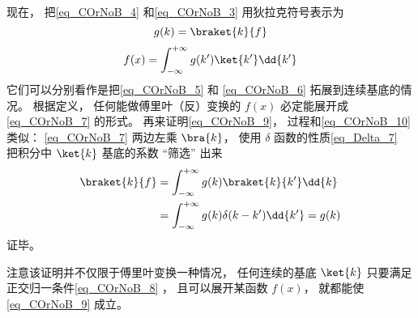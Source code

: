 现在， 把\autoref{eq_COrNoB_4}  和\autoref{eq_COrNoB_3} 用狄拉克符号表示为
\begin{equation}\label{eq_COrNoB_9}
g(k) = \braket{k}{f}
\end{equation}
\begin{equation}\label{eq_COrNoB_7}
f(x) = \int_{-\infty}^{+\infty} g(k') \ket{k'} \dd{k'}
\end{equation}
它们可以分别看作是把\autoref{eq_COrNoB_5} 和 \autoref{eq_COrNoB_6} 拓展到连续基底的情况。 根据定义， 任何能做傅里叶（反）变换的 $f(x)$ 必定能展开成\autoref{eq_COrNoB_7} 的形式。 再来证明\autoref{eq_COrNoB_9}， 过程和\autoref{eq_COrNoB_10} 类似： \autoref{eq_COrNoB_7} 两边左乘 $\bra{k}$， 使用 $\delta$ 函数的性质\autoref{eq_Delta_7}~ 把积分中 $\ket{k}$ 基底的系数 “筛选” 出来
\begin{equation}
\begin{aligned}
\braket{k}{f} &= \int_{-\infty}^{+\infty} g(k) \braket{k}{k'} \dd{k}\\
&= \int_{-\infty}^{+\infty} g(k) \delta(k-k') \dd{k'}
= g(k)
\end{aligned}
\end{equation}
证毕。

注意该证明并不仅限于傅里叶变换一种情况， 任何连续的基底 $\ket{k}$ 只要满足正交归一条件\autoref{eq_COrNoB_8} ， 且可以展开某函数 $f(x)$， 就都能使\autoref{eq_COrNoB_9} 成立。
